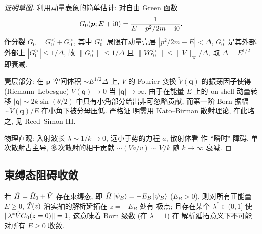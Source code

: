 \begin{proof}[证明草图]
利用动量表象的简单估计: 对自由 Green 函数
\begin{equation}
G_{0}(\bm p;E+\mathrm{i} 0)=\frac{1}{E-p^{2}/2m+\mathrm{i} 0}.
\label{eq:born-G0-mom}
\end{equation}
作分裂 $G_{0}=G_{0}^{<}+G_{0}^{>}$, 其中 $G_{0}^{<}$ 局限在动量壳层
$|p^{2}/2m-E|<\Delta$, $G_{0}^{>}$ 是其外部. 外部上 $|G_{0}^{>}|\le 1/\Delta$,
故 $\|G_{0}^{>}\|\le 1/\Delta$ 且 $\|VG_{0}^{>}\|\le \|V\|_{\infty}/\Delta$,
取 $\Delta=E^{1/2}$ 即衰减.

壳层部分: 在 $\bm p$ 空间体积 $\sim E^{1/2}\Delta$ 上, $V$ 的 Fourier
变换 $\widetilde V(\bm q)$ 的振荡因子使得 (Riemann--Lebesgue)
$\widetilde V(\bm q)\to 0$ 当 $|\bm q|\to\infty$. 由于在能量 $E$ 上的 on-shell
动量转移 $|\bm q|\sim 2k\sin(\theta/2)$ 中只有小角部分给出非可忽略贡献,
而第一阶 Born 振幅 $\sim\widetilde V(\bm q)/E$ 在小角下被分母压低. 严格证
明需用 Kato--Birman 散射理论, 在此略之, 见 Reed--Simon III.

物理直观: 入射波长 $\lambda\sim 1/k\to 0$, 远小于势的力程 $a$, 散射体看
作 “瞬时" 障碍, 单次散射占主导, 多次散射的相干贡献 $\sim (V a/v)\sim V/k$
随 $k\to\infty$ 衰减.
\end{proof}

\subsection{束缚态阻碍收敛}

\begin{theorem}\label{thm:bound-state-block}
若 $\hat{H}=\hat{H}_{0}+\hat{V}$ 存在束缚态, 即 $\hat{H}\ket{\psi_{B}}=-E_{B}\ket{\psi_{B}}$ ($E_{B}>0$),
则对所有正能量 $E\ge 0$, $\hat{T}(z)$ 沿实轴的解析延拓在 $z=-E_{B}$ 处有
极点; 且存在某个 $\lambda^{*}\in(0,1]$ 使
$\|\lambda^{*}\hat{V} G_{0}(z=0)\|=1$, 这意味着 Born 级数 (在 $\lambda=1$) 在
解析延拓意义下不可能对所有 $E\ge 0$ 收敛.
\end{theorem}


